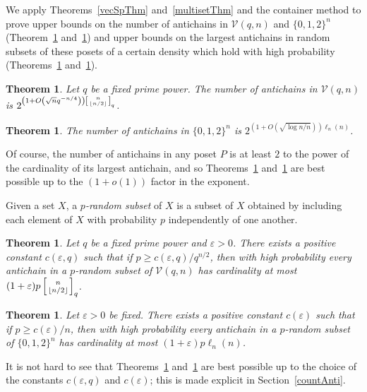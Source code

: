 \documentclass[11 pt]{article}
\newtheorem{thm}[equation]{Theorem}
\theoremstyle{definition}
\theoremstyle{case}
\numberwithin{equation}{section}
\newcommand{\qbinom}[3]{\left[\genfrac{}{}{0pt}{}{#1}{#2}\right]_{#3}}
\newcommand{\Vectors}[2]{\mathcal{V}\left(#1,#2\right)}
\begin{document}
We apply Theorems~\ref{vecSpThm} and~\ref{multisetThm} and the container method to prove upper bounds on the number of antichains in $\Vectors{q}{n}$ and $\{0,1,2\}^n$ (Theorem~\ref{countVec} and~\ref{countMulti}) and upper bounds on the largest antichains in random subsets of these posets of a certain density which hold with high probability (Theorems~\ref{randVecSp} and~\ref{randMultiset}).

\begin{thm}
\label{countVec}
Let $q$ be a fixed prime power. The number of antichains in $\mathcal{V}(q,n)$ is $2^{\left(1+O\left(\sqrt{n}q^{-n/4}\right)\right)\qbinom{n}{\left\lfloor n/2\right\rfloor}{q}}$. 
\end{thm}

\begin{thm}
\label{countMulti}
The number of antichains in $\{0,1,2\}^n$ is $2^{\left(1+O\left(\sqrt{\log{n}/n}\right)\right)\ell_n(n)}$. 
\end{thm}


Of course, the number of antichains in any poset $P$ is at least $2$ to the power of the cardinality of its largest antichain, and so Theorems~\ref{countVec} and~\ref{countMulti} are best possible up to the $(1+o(1))$ factor in the exponent.

Given a set $X$, a \emph{$p$-random subset} of $X$ is a subset of $X$ obtained by including each element of $X$ with probability $p$ independently of one another. 



\begin{thm}
\label{randVecSp}
Let $q$ be a fixed prime power and $\varepsilon>0$. There exists a positive constant $c(\varepsilon,q)$ such that if $p\geq c(\varepsilon,q)/q^{n/2}$, then with high probability every antichain in a $p$-random subset of $\Vectors{q}{n}$ has cardinality at most $(1+\varepsilon)p\qbinom{n}{\left\lfloor n/2\right\rfloor}{q}$. 
\end{thm}



\begin{thm}
\label{randMultiset}
Let $\varepsilon>0$ be fixed. There exists a positive constant $c(\varepsilon)$ such that if $p\geq c(\varepsilon)/n$, then with high probability every antichain in a $p$-random subset of $\{0,1,2\}^n$ has cardinality at most $(1+\varepsilon)p\ell_n(n)$. 
\end{thm}

It is not hard to see that Theorems~\ref{randVecSp} and~\ref{randMultiset} are best possible up to the choice of the constants $c(\varepsilon,q)$ and $c(\varepsilon)$; this is made explicit in Section~\ref{countAnti}.
\end{document}
